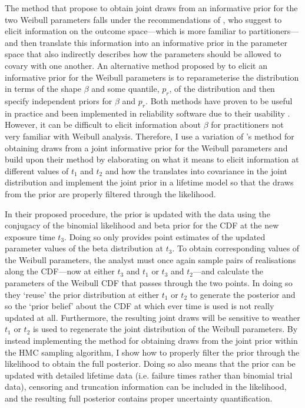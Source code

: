 The method that \citeauthor{kaminskiy2005} propose to obtain joint draws from an informative prior for the two Weibull parameters falls under the recommendations of \citet{gelman_workflow_2020}, who suggest to elicit information on the outcome space---which is more familiar to partitioners---and then translate this information into an informative prior in the parameter space that also indirectly describes how the parameters should be allowed to covary with one another. An alternative method proposed by \citet{Meeker2022} to elicit an informative prior for the Weibull parameters is to reparameterise the distribution in terms of the shape $\beta$ and some quantile, $p_r$, of the distribution and then specify independent priors for $\beta$ and $p_r$. Both methods have proven to be useful in practice and been implemented in reliability software due to their usability \citep{krivtsov2017}. However, it can be difficult to elicit information about $\beta$ for practitioners not very familiar with Weibull analysis. Therefore, I use a variation of \citeauthor{kaminskiy2005}'s method for obtaining draws from a joint informative prior for the Weibull parameters and build upon their method by elaborating on what it means to elicit information at different values of $t_1$ and $t_2$ and how the translates into covariance in the joint distribution and implement the joint prior in a lifetime model so that the draws from the prior are properly filtered through the likelihood.

In their proposed procedure, the prior is updated with the data using the conjugacy of the binomial likelihood and beta prior for the CDF at the new exposure time $t_3$. Doing so only provides point estimates of the updated parameter values of the beta distribution at $t_3$. To obtain corresponding values of the Weibull parameters, the analyst must once again sample pairs of realisations along the CDF---now at either $t_3$ and $t_1$ or $t_3$ and $t_2$---and calculate the parameters of the Weibull CDF that passes through the two points. In doing so they `reuse' the prior distribution at either $t_1$ or $t_2$ to generate the posterior and so the `prior belief' about the CDF at which ever time is used is not really updated at all. Furthermore, the resulting joint draws will be sensitive to weather $t_1$ or $t_2$ is used to regenerate the joint distribution of the Weibull parameters. By instead implementing the method for obtaining draws from the joint prior within the HMC sampling algorithm, I show how to properly filter the prior through the likelihood to obtain the full posterior. Doing so also means that the prior can be updated with detailed lifetime data (i.e. failure times rather than binomial trial data), censoring and truncation information can be included in the likelihood, and the resulting full posterior contains proper uncertainty quantification. 

